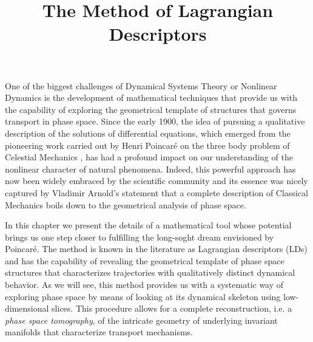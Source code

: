 \documentclass[8pt]{article}
\begin{document}

	
\title{The Method of Lagrangian Descriptors}

\date{}
	
	
\maketitle

\vspace{-0.5cm}

One of the biggest challenges of Dynamical Systems Theory or Nonlinear Dynamics is the development of mathematical techniques that provide us with the capability of exploring the geometrical template of structures that governs transport in phase space. Since the early 1900, the idea of pursuing a qualitative description of the solutions of differential equations, which emerged from the pioneering work carried out by Henri Poincar\'e on the three body problem of Celestial Mechanics \cite{hp1890}, has had a profound impact on our understanding of the nonlinear character of natural phenomena. Indeed, this powerful approach has now been widely embraced by the scientific community and its essence was nicely captured by Vladimir Arnold's statement that a complete description of Classical Mechanics boils down to the geometrical analysis of phase space. 

In this chapter we present the details of a mathematical tool whose potential brings us  one step closer to fulfilling the long-soght dream envisioned by Poincar\'e. The method is known in the literature as Lagrangian descriptors (LDs) and has the capability of revealing the geometrical template of phase space structures that characterizes trajectories with qualitatively distinct dynamical behavior. As we will see, this method provides us with a systematic way of exploring phase space by means of looking at its dynamical skeleton using low-dimensional slices. This procedure allows for a complete reconstruction, i.e. a \textit{phase space tomography}, of the intricate geometry of underlying invariant manifolds that characterize transport mechanisms.
\end{document}
